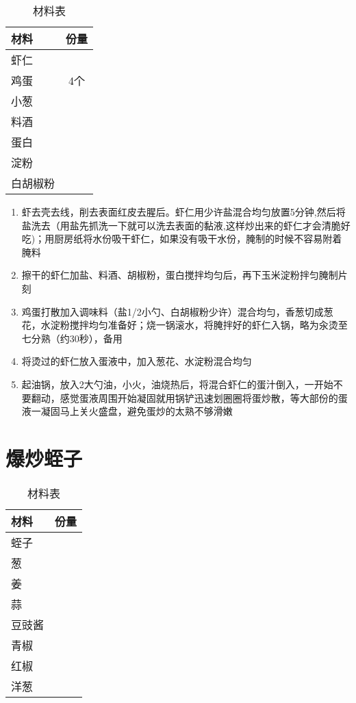 \begin{table}[H]
    \centering
    \begin{tabular}{|l||c|}\hline
     \textbf{材料}    &  \textbf{份量}\\ \hline\hline
    虾仁   &   \\ \hline
    鸡蛋 & 4个\\ \hline
    小葱    &   \\ \hline
    料酒 & \\ \hline
    蛋白 & \\ \hline
    淀粉 & \\ \hline 
    白胡椒粉 & \\ \hline
    \end{tabular}
    \caption{材料表}
\end{table}

\begin{enumerate}
    \item 虾去壳去线，削去表面红皮去腥后。虾仁用少许盐混合均匀放置5分钟,然后将盐洗去（用盐先抓洗一下就可以洗去表面的黏液,这样炒出来的虾仁才会清脆好吃)；用厨房纸将水份吸干虾仁，如果没有吸干水份，腌制的时候不容易附着腌料
    \item 擦干的虾仁加盐、料酒、胡椒粉，蛋白搅拌均匀后，再下玉米淀粉拌匀腌制片刻
    \item 鸡蛋打散加入调味料（盐1/2小勺、白胡椒粉少许）混合均匀，香葱切成葱花，水淀粉搅拌均匀准备好；烧一锅滚水，将腌拌好的虾仁入锅，略为汆烫至七分熟（约30秒），备用
    \item 将烫过的虾仁放入蛋液中，加入葱花、水淀粉混合均匀
    \item 起油锅，放入2大勺油，小火，油烧热后，将混合虾仁的蛋汁倒入，一开始不要翻动，感觉蛋液周围开始凝固就用锅铲迅速划圈圈将蛋炒散，等大部份的蛋液一凝固马上关火盛盘，避免蛋炒的太熟不够滑嫩
\end{enumerate}


\section{爆炒蛭子}

\begin{table}[H]
    \centering
    \begin{tabular}{|l||c|}\hline
     \textbf{材料}    &  \textbf{份量}\\ \hline\hline
    蛭子   &   \\ \hline
    葱 & \\ \hline
    姜    &   \\ \hline
    蒜 & \\ \hline
    豆豉酱 & \\ \hline
    青椒 & \\ \hline 
    红椒 & \\ \hline
    洋葱 & \\ \hline
    \end{tabular}
    \caption{材料表}
\end{table}

